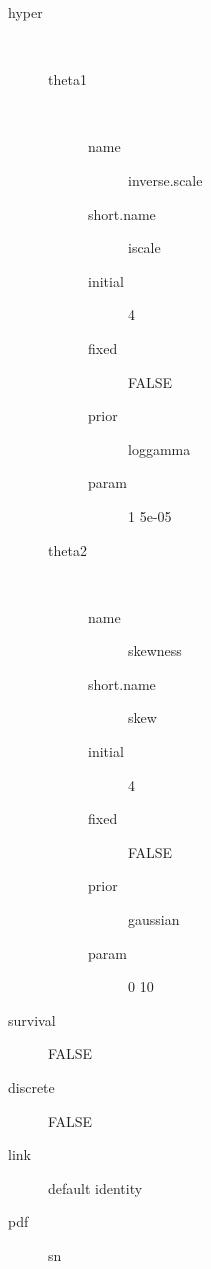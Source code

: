 \begin{description}
	\item[hyper]\ 
	 \begin{description}
	 	\item[theta1]\ 
	 	 \begin{description}
	 	 	 \item[ name ] inverse.scale 
	 	 	 \item[ short.name ] iscale 
	 	 	 \item[ initial ] 4 
	 	 	 \item[ fixed ] FALSE 
	 	 	 \item[ prior ] loggamma 
	 	 	 \item[ param ] 1 5e-05 
	 	 \end{description}
	 	\item[theta2]\ 
	 	 \begin{description}
	 	 	 \item[ name ] skewness 
	 	 	 \item[ short.name ] skew 
	 	 	 \item[ initial ] 4 
	 	 	 \item[ fixed ] FALSE 
	 	 	 \item[ prior ] gaussian 
	 	 	 \item[ param ] 0 10 
	 	 \end{description}
	 \end{description}
	 \item[ survival ] FALSE 
	 \item[ discrete ] FALSE 
	 \item[ link ] default identity 
	 \item[ pdf ] sn 
\end{description}
